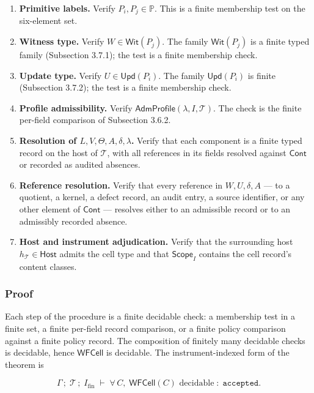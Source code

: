 \documentclass[11pt]{article}
\providecommand{\tightlist}{}
\theoremstyle{definition}
\begin{document}
\begin{enumerate}
\def\labelenumi{\arabic{enumi}.}
\tightlist
\item
  \textbf{Primitive labels.} Verify \(P_i,P_j\in\mathbb P\). This is a finite membership test on the six-element set.
\item
  \textbf{Witness type.} Verify \(W\in\mathsf{Wit}(P_j)\). The family \(\mathsf{Wit}(P_j)\) is a finite typed family (Subsection 3.7.1); the test is a finite membership check.
\item
  \textbf{Update type.} Verify \(U\in\mathsf{Upd}(P_i)\). The family \(\mathsf{Upd}(P_i)\) is finite (Subsection 3.7.2); the test is a finite membership check.
\item
  \textbf{Profile admissibility.} Verify \(\mathsf{AdmProfile}(\lambda,I,\mathcal T)\). The check is the finite per-field comparison of Subsection 3.6.2.
\item
  \textbf{Resolution of \(L,V,\Theta,A,\delta,\lambda\).} Verify that each component is a finite typed record on the host of \(\mathcal T\), with all references in its fields resolved against \(\mathsf{Cont}\) or recorded as audited absences.
\item
  \textbf{Reference resolution.} Verify that every reference in \(W,U,\delta,A\) --- to a quotient, a kernel, a defect record, an audit entry, a source identifier, or any other element of \(\mathsf{Cont}\) --- resolves either to an admissible record or to an admissibly recorded absence.
\item
  \textbf{Host and instrument adjudication.} Verify that the surrounding host \(h_{\mathcal T}\in\mathsf{Host}\) admits the cell type and that \(\mathsf{Scope}_I\) contains the cell record's content classes.
\end{enumerate}

\subsubsection{Proof}

Each step of the procedure is a finite decidable check: a membership test in a finite set, a finite per-field record comparison, or a finite policy comparison against a finite policy record. The composition of finitely many decidable checks is decidable, hence \(\mathsf{WFCell}\) is decidable. The instrument-indexed form of the theorem is

\[
\Gamma\,;\;\mathcal T\,;\;I_{\mathrm{fin}}\;\vdash\;\forall\,C,\;\mathsf{WFCell}(C)\text{ decidable}\;:\;\texttt{accepted}.
\]
\end{document}
